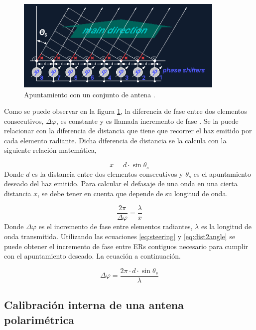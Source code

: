\begin{figure}[H]
 \centering
 \includegraphics[width=10cm]{gfx/beamSteering.png}
 \caption{Apuntamiento con un conjunto de antena \cite{BeamSteering}.}
 \label{fig:beamSteering}
\end{figure}

Como se puede observar en la figura \ref{fig:beamSteering}, la diferencia de fase entre dos elementos consecutivos,
$\Delta\varphi$, es constante y es llamada incremento de fase \cite{BeamSteering}. Se la puede relacionar con la diferencia
de distancia que tiene que recorrer el haz emitido por cada elemento radiante. Dicha diferencia de distancia se la calcula con
la siguiente relación matemática,


\begin{equation}
	x = d\cdot \sin{\theta_s}
	\label{eq:steering}
\end{equation}
Donde $d$ es la distancia entre dos elementos consecutivos y $\theta_s$ es el apuntamiento deseado del haz emitido. Para calcular
el defasaje de una onda en una cierta distancia $x$, se debe tener en cuenta que depende de su longitud de onda.

\begin{equation}
	\dfrac{2\pi}{\Delta\varphi} = \dfrac{\lambda}{x}
	\label{eq:dist2angle}
\end{equation}
Donde $\Delta\varphi$ es el incremento de fase entre elementos radiantes, $\lambda$ es la longitud de onda transmitida.
Utilizando las ecuaciones \ref{eq:steering} y \ref{eq:dist2angle} se puede obtener el incremento de fase entre ERs contiguos 
necesario para cumplir con el apuntamiento deseado. La ecuación a continuación.

\begin{equation}
	\Delta\varphi = \dfrac{2\pi\cdot d\cdot\sin{\theta_s}}{\lambda}
\end{equation}

\subsection{Calibración interna de una antena polarimétrica}

